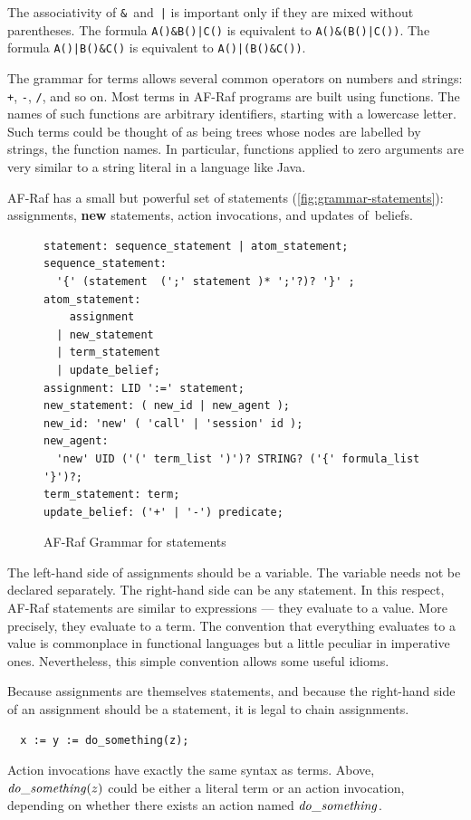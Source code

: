 \documentclass[a4paper,12pt,oneside,fleqn]{book} %
\begin{document}
{\begin{example}
The associativity of \verb+&+~and~\verb+|+ is important only if they are
mixed without parentheses.  The formula \verb+A()&B()|C()+ is equivalent to
\verb+A()&(B()|C())+.  The formula \verb+A()|B()&C()+ is equivalent to
\verb+A()|(B()&C())+.
\end{example}

The grammar for terms allows several common operators on numbers and
strings: \verb-+-, \verb+-+, \verb+/+, and so on. Most terms in AF-Raf
programs are built using functions. The names of such functions are
arbitrary identifiers, starting with a lowercase letter. Such terms could
be thought of as being trees whose nodes are labelled by strings, the
function names. In particular, functions applied to zero arguments are very
similar to a string literal in a language like Java.

AF-Raf has a small but powerful set of statements
(\autoref{fig:grammar-statements}): assignments, {\bf new} statements,
action invocations, and updates of~beliefs.

\begin{figure}\footnotesize %
\begin{verbatim}
statement: sequence_statement | atom_statement;
sequence_statement:
  '{' (statement  (';' statement )* ';'?)? '}' ;
atom_statement:
    assignment
  | new_statement
  | term_statement
  | update_belief;
assignment: LID ':=' statement;
new_statement: ( new_id | new_agent );
new_id: 'new' ( 'call' | 'session' id );
new_agent:
  'new' UID ('(' term_list ')')? STRING? ('{' formula_list '}')?;
term_statement: term;
update_belief: ('+' | '-') predicate;
\end{verbatim}
\caption{AF-Raf Grammar for statements}
\label{fig:grammar-statements}
\end{figure} %

The left-hand side of assignments should be a variable. The variable needs
not be declared separately.  The right-hand side can be any statement.  In
this respect, AF-Raf statements are similar to expressions --- they
evaluate to a value. More precisely, they evaluate to a term. The
convention that everything evaluates to a value is commonplace in
functional languages but a little peculiar in imperative ones.
Nevertheless, this simple convention allows some useful idioms.

\begin{example}
Because assignments are themselves statements, and because the right-hand
side of an assignment should be a statement, it is legal to chain
assignments.
\begin{verbatim}
  x := y := do_something(z);
\end{verbatim}
Action invocations have exactly the same syntax as terms. Above, ${\it
do\_something}(z)$ could be either a literal term or an action invocation,
depending on whether there exists an action named ${\it do\_something}$.
\end{example}

}
\end{document}
